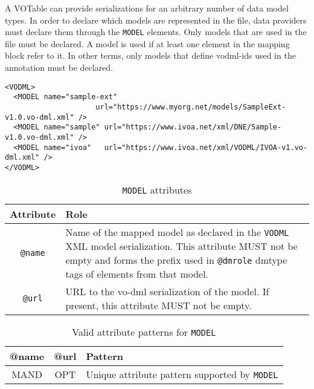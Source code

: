 A VOTable can provide serializations for an arbitrary number of data model
types. In order to declare which models are represented in the file, data
providers must declare them through the \texttt{MODEL} elements.
Only models that are used in the file must be declared. A model is
used if at least one element in the mapping block refer to it. In other terms, only models that define vodml-ids used in the
annotation must be declared.

\begin{lstlisting}[frame=single,caption={Example \texttt{MODEL} mapping block},style=XML,basicstyle=\tiny]
<VODML>
  <MODEL name="sample-ext"
                     url="https://www.myorg.net/models/SampleExt-v1.0.vo-dml.xml" />
  <MODEL name="sample" url="https://www.ivoa.net/xml/DNE/Sample-v1.0.vo-dml.xml" />
  <MODEL name="ivoa"   url="https://www.ivoa.net/xml/VODML/IVOA-v1.vo-dml.xml" />
</VODML>
\end{lstlisting}

\begin{table}[!htbp]
  \small
  \centering
  \begin{tabulary}{\linewidth}{|c|J|}       
    \hline 
         \textbf{Attribute} & 
         \textbf {Role}\\
    \hline
    \hline  
         \texttt{@name}  & 
         Name of the mapped model as declared in the \texttt{VODML} XML model serialization.  This attribute MUST not be empty and forms the prefix used in  \texttt{@dmrole} dmtype tags of elements from that model.  \\
    \hline 
         \texttt{@url} & 
         URL to the vo-dml serialization of the model. If present, this attribute MUST not be empty.\\
    \hline 
  \end{tabulary}
  \caption{\texttt{MODEL} attributes} 
  \label{tbl:model-att}
\end{table}


\begin{table}[!htbp]
  \small
  \centering
  \begin{tabulary}{\linewidth}{|c |c |J|}
    \hline 
        \textbf{@name} &
        \textbf{@url} &
        \textbf{Pattern}\\
    \hline      \hline  
        MAND &           
        OPT &           
        Unique attribute pattern supported by \texttt{MODEL}\\
    \hline 
  \end{tabulary}
  \caption{Valid attribute patterns for  \texttt{MODEL}} 
  \label{tbl:model-pattern}
\end{table}
